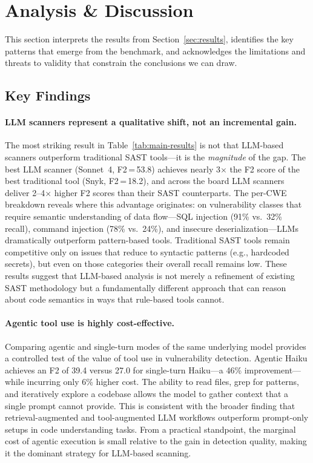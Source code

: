 \section{Analysis \& Discussion}
\label{sec:discussion}

This section interprets the results from Section~\ref{sec:results},
identifies the key patterns that emerge from the benchmark, and
acknowledges the limitations and threats to validity that constrain
the conclusions we can draw.

\subsection{Key Findings}
\label{sec:key-findings}

\paragraph{LLM scanners represent a qualitative shift, not an incremental gain.}
The most striking result in Table~\ref{tab:main-results} is not that
LLM-based scanners outperform traditional SAST tools---it is the
\emph{magnitude} of the gap.  The best LLM scanner (Sonnet~4, F2\,=\,53.8)
achieves nearly 3$\times$ the F2 score of the best traditional tool
(Snyk, F2\,=\,18.2), and across the board LLM scanners deliver 2--4$\times$
higher F2 scores than their SAST counterparts.  The per-CWE breakdown
reveals where this advantage originates: on vulnerability classes that
require semantic understanding of data flow---SQL injection (91\% vs.\
32\% recall), command injection (78\% vs.\ 24\%), and insecure
deserialization---LLMs dramatically outperform pattern-based tools.
Traditional SAST tools remain competitive only on issues that reduce to
syntactic patterns (e.g., hardcoded secrets), but even on those
categories their overall recall remains low.  These results suggest that
LLM-based analysis is not merely a refinement of existing SAST
methodology but a fundamentally different approach that can reason about
code semantics in ways that rule-based tools cannot.

\paragraph{Agentic tool use is highly cost-effective.}
Comparing agentic and single-turn modes of the same underlying model
provides a controlled test of the value of tool use in vulnerability
detection.  Agentic Haiku achieves an F2 of 39.4 versus 27.0 for
single-turn Haiku---a 46\% improvement---while incurring only 6\% higher
cost.  The ability to read files, grep for patterns, and iteratively
explore a codebase allows the model to gather context that a single
prompt cannot provide.  This is consistent with the broader finding that
retrieval-augmented and tool-augmented LLM workflows outperform
prompt-only setups in code understanding tasks.  From a practical
standpoint, the marginal cost of agentic execution is small relative to
the gain in detection quality, making it the dominant strategy for
LLM-based scanning.


